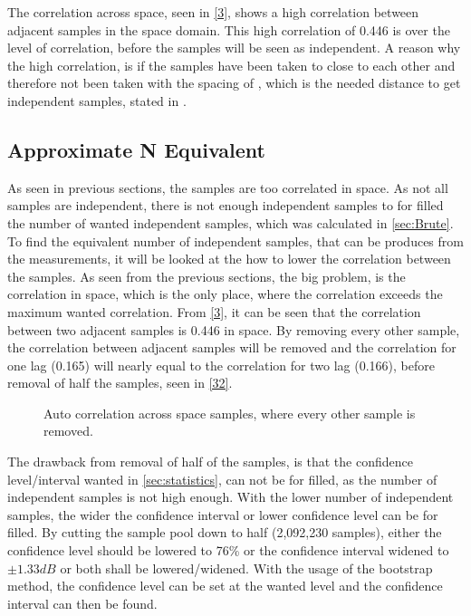 The correlation across space, seen in \autoref{3}, shows a high correlation between adjacent samples in the space domain. This high correlation of 0.446 is over the level of correlation, before the samples will be seen as independent. A reason why the high correlation, is if the samples have been taken to close to each other and therefore not been taken with the spacing of , which is the needed distance to get independent samples, stated in .


\subsection{Approximate N Equivalent}


As seen in previous sections, the samples are too correlated in space. As not all samples are independent, there is not enough independent samples to for filled the number of wanted independent samples, which was calculated in \autoref{sec:Brute}. To find the equivalent number of independent samples, that can be produces from the measurements, it will be looked at the how to lower the correlation between the samples. As seen from the previous sections, the big problem, is the correlation in space, which is the only place, where the correlation exceeds the maximum wanted correlation. From \autoref{3}, it can be seen that the correlation between two adjacent samples is 0.446 in space. By removing every other sample, the correlation between adjacent samples will be removed and the correlation for one lag (0.165) will nearly equal to the correlation for two lag (0.166), before removal of half the samples, seen in \autoref{32}.


\begin{figure}[H]
\begin{center}

\caption{Auto correlation across space samples, where every other sample is removed.}
\label{32}
\end{center}
\end{figure}

The drawback from removal of half of the samples, is that the confidence level/interval wanted in \autoref{sec:statistics}, can not be for filled, as the number of independent samples is not high enough. With the lower number of independent samples, the wider the confidence interval or lower confidence level can be for filled. By cutting the sample pool down to half (2,092,230 samples), either the confidence level should be lowered to 76\% or the confidence interval widened to $\pm 1.33dB$ or both shall be lowered/widened. With the usage of the bootstrap method, the confidence level can be set at the wanted level and the confidence interval can then be found.



